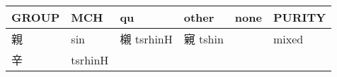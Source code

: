 \documentclass[14pt,a4paper]{scrartcl}
\begin{document}
\begin{longtable}[c]{@{}llllll@{}}
\toprule
\begin{minipage}[b]{0.14\columnwidth}\raggedright\strut
GROUP
\strut\end{minipage} &
\begin{minipage}[b]{0.14\columnwidth}\raggedright\strut
MCH
\strut\end{minipage} &
\begin{minipage}[b]{0.14\columnwidth}\raggedright\strut
qu
\strut\end{minipage} &
\begin{minipage}[b]{0.14\columnwidth}\raggedright\strut
other
\strut\end{minipage} &
\begin{minipage}[b]{0.14\columnwidth}\raggedright\strut
none
\strut\end{minipage} &
\begin{minipage}[b]{0.14\columnwidth}\raggedright\strut
PURITY
\strut\end{minipage}\tabularnewline
\midrule
\endhead
\begin{minipage}[t]{0.14\columnwidth}\raggedright\strut
親
\strut\end{minipage} &
\begin{minipage}[t]{0.14\columnwidth}\raggedright\strut
sin
\strut\end{minipage} &
\begin{minipage}[t]{0.14\columnwidth}\raggedright\strut
櫬 tsrhinH
\strut\end{minipage} &
\begin{minipage}[t]{0.14\columnwidth}\raggedright\strut
寴 tshin
\strut\end{minipage} &
\begin{minipage}[t]{0.14\columnwidth}\raggedright\strut
\strut\end{minipage} &
\begin{minipage}[t]{0.14\columnwidth}\raggedright\strut
mixed
\strut\end{minipage}\tabularnewline
\begin{minipage}[t]{0.14\columnwidth}\raggedright\strut
辛
\strut\end{minipage} &
\begin{minipage}[t]{0.14\columnwidth}\raggedright\strut
tsrhinH
\strut\end{minipage} &
\begin{minipage}[t]{0.14\columnwidth}\raggedright\strut
\strut\end{minipage} &
\begin{minipage}[t]{0.14\columnwidth}\raggedright\strut

\end{minipage}
\end{longtable}
\end{document}
